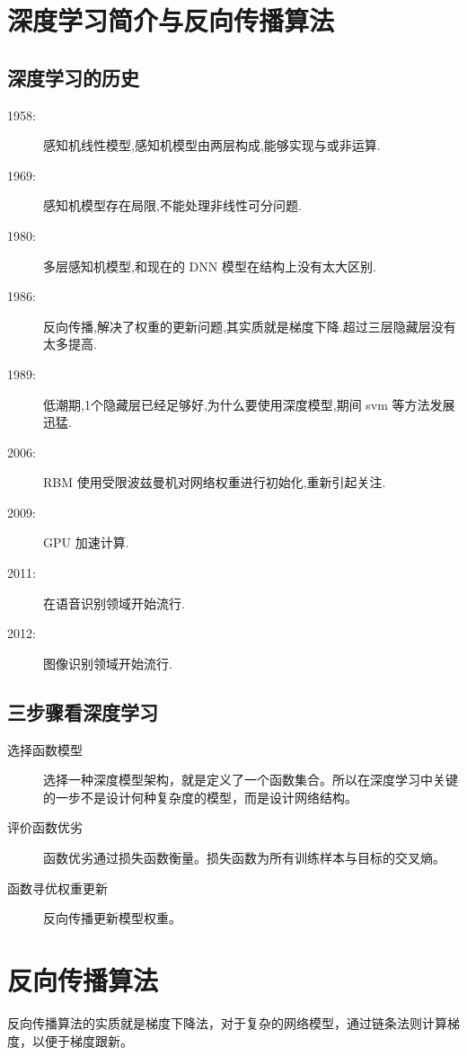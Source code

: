\section{深度学习简介与反向传播算法}
\subsection{深度学习的历史}
\begin{description}
	\item[1958:] 感知机线性模型,感知机模型由两层构成,能够实现与或非运算.
	\item[1969:] 感知机模型存在局限,不能处理非线性可分问题.
	\item[1980:] 多层感知机模型,和现在的 DNN 模型在结构上没有太大区别.
	\item[1986:] 反向传播,解决了权重的更新问题,其实质就是梯度下降.超过三层隐藏层没有太多提高.
	\item[1989:] 低潮期,1个隐藏层已经足够好,为什么要使用深度模型,期间 svm 等方法发展迅猛.
	\item[2006:] RBM 使用受限波兹曼机对网络权重进行初始化,重新引起关注.
	\item[2009:] GPU 加速计算.
	\item[2011:]在语音识别领域开始流行.
	\item[2012:] 图像识别领域开始流行.
\end{description}

\subsection{三步骤看深度学习}

\begin{description}
	\item[选择函数模型] 选择一种深度模型架构，就是定义了一个函数集合。所以在深度学习中关键的一步不是设计何种复杂度的模型，而是设计网络结构。
	\item[评价函数优劣] 函数优劣通过损失函数衡量。损失函数为所有训练样本与目标的交叉熵。
	\item[函数寻优权重更新] 反向传播更新模型权重。
\end{description}

\section{反向传播算法}
反向传播算法的实质就是梯度下降法，对于复杂的网络模型，通过链条法则计算梯度，以便于梯度跟新。

